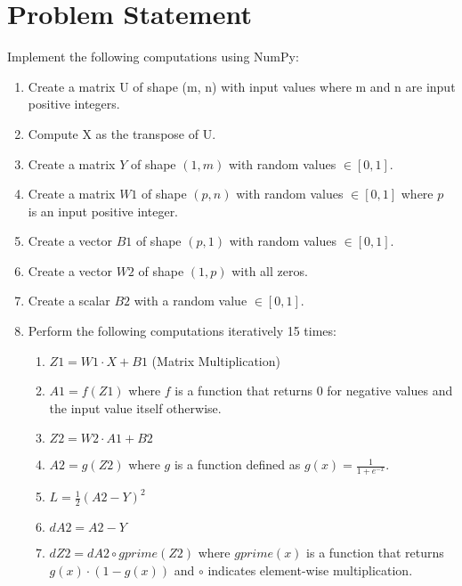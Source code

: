 
\section*{Problem Statement}
\large
Implement the following computations using NumPy: 

\begin{enumerate}
    \item Create a matrix U of shape (m, n) with input values where m and n are input
positive integers.
    \item Compute X as the transpose of U.
      \item Create a matrix $Y$ of shape $(1, m)$ with random values $\in [0, 1]$.
    \item Create a matrix $W1$ of shape $(p, n)$ with random values $\in [0, 1]$ where $p$ is an input positive integer.
    \item Create a vector $B1$ of shape $(p, 1)$ with random values $\in [0, 1]$.
    \item Create a vector $W2$ of shape $(1, p)$ with all zeros.
    \item Create a scalar $B2$ with a random value $\in [0, 1]$.
    \item Perform the following computations iteratively 15 times:
   \begin{enumerate}
        \item $Z1 = W1 \cdot X + B1$ \hspace{0.2cm} (Matrix Multiplication)
        \item $A1 = f(Z1)$ \hspace{0.2cm} where $f$ is a function that returns 0 for negative values and the input value itself otherwise.
        \item $Z2 = W2 \cdot A1 + B2$
        \item $A2 = g(Z2)$ \hspace{0.2cm} where $g$ is a function defined as $g(x) = \frac{1}{1+e^{-x}}$.
        \item $L = \frac{1}{2} (A2 - Y)^2$
        \item $dA2 = A2 - Y$
        \item $dZ2 = dA2 \circ gprime(Z2)$ \hspace{0.2cm} where $gprime(x)$ is a function that returns $g(x) \cdot (1 - g(x))$ and $\circ$ indicates element-wise multiplication.

\end{enumerate}
\end{enumerate}
